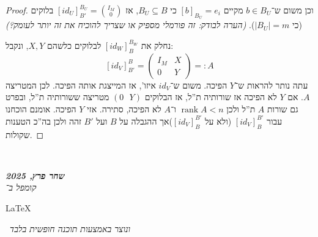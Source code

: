 \documentclass[]{article}
\newcommand\en[1] {\begin{otherlanguage}{english}#1\end{otherlanguage}}
\newcommand\ndoc  {\dotfill \\ \vfil {\begin{center}
            {\textbf{\textit{שחר פרץ, 2025}} \\
                \scriptsize \textit{קומפל ב־}\en{\LaTeX}\,\textit{ ונוצר באמצעות תוכנה חופשית בלבד}}
    \end{center}} \vfil	}
\DeclareMathOperator{\rk}     {rank}
\newcommand\pms[1]    {\begin{pmatrix}
        #1
\end{pmatrix}}
\theoremstyle{definition}
\begin{document}
\begin{enumerate}[A)]
\begin{proof}
            וכן משום ש־$b \in B_U$ מקיים $[b]_{B_U} = e_i$ כי $B_U \subseteq B$, אז $[id_U]^{B_U}_{B'} = \binom{I_M}{0}$ בלוקים (כי $|B_U| = m$). 
            \textit{(הערה לבודק: זה פורמלי מספיק או שצריך להוכיח את זה יותר לעומק?)}
            
             נחלק את $[id_W]^{B_W}_{B}$ לבלוקים כלשהם $X, Y$, ונקבל:
            \[ [id_V]^{B}_{B'} = \pms{I_M & X \\ 0 & Y} =: A \]
            עתה נותר להראות ש־$Y$ הפיכה. משום ש־$id_V$ איזו', אז המייצגת אותה הפיכה. לכן המטריצה $A$. אם $Y$ לא הפיכה אז שורותיה ת''ל, אז הבלוקים $(0\,\,\,\, Y)$ מטריצה ששורותיה ת''ל, ובפרט גם שורות $A$ ת''ל ולכן $\rk A < n$ ו־$A$ לא הפיכה, סתירה. אזי $Y$ הפיכה. אומנם הוכחנו עבור $[id_V]^{B'}_{B}$ (ולא על $[id_V]^{B'}_{B}$)אך ההגבלה על $B$ ועל $B'$ זהה ולכן בה''כ הטענות שקולות. 
            
        \end{proof}
    \end{enumerate}
    
    \ndoc
\end{document}
